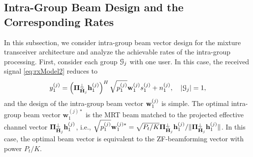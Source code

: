 \documentclass[11pt, draft, onecolumn ]{IEEEtran}
\begin{document}
\subsection{Intra-Group Beam Design and the Corresponding Rates}
\label{Beam Design for the Proposed Structure}




In this subsection, we consider intra-group beam vector design for the {}{mixture}
transceiver architecture and analyze the achievable rates of the intra-group processing. First, consider each group ${\cal G}_j$ with one user. In this case, the received signal \eqref{eq:rxModel2}
reduces to
\begin{equation}  \label{eq:received_1user}
    y_1^{(j)}     =  \left({\bf \Pi}_{\tilde{{\bf H}}_j}^\bot {\bf h}_1^{(j)}\right)^H  \sqrt{p_1^{(j)}} \mathbf{w}_1^{(j)}
    s_1^{(j)} + n_1^{(j)}, \quad |\mathcal{G}_j|  = 1,
\end{equation}
and the design of the  intra-group beam vector  ${\bf w}_1^{(j)}$ is simple. The optimal intra-group beam vector
$\mathbf{w}_1^{(j)*}$ is the MRT beam matched to the projected effective channel vector ${\bf \Pi}_{\tilde{{\bf H}}_j}^\bot {\bf h}_1^{(j)}$, i.e.,
   $\sqrt{p_1^{(j)}} \mathbf{w}_1^{(j)*} = \sqrt{P_t/K} {{\bf \Pi}_{\tilde{{\bf H}}_j}^\bot {\bf h}_1^{(j)}}/{\|{\bf \Pi}_{\tilde{{\bf H}}_j}^\bot {\bf h}_1^{(j)}\|}$.
In this case, the optimal beam vector is equivalent to the ZF-beamforming vector with power $P_t/K$.
\end{document}
